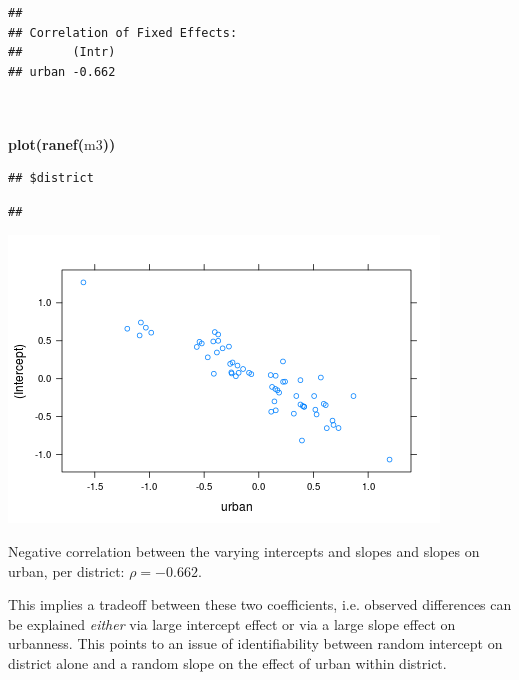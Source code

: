 \documentclass{article}
\makeatletter
\newcommand{\hlfunctioncall}[1]{\textcolor[rgb]{.5,0,.33}{\textbf{#1}}}%
\newcommand{\hlkeyword}[1]{\textbf{#1}}%
\newcommand{\hlsymbol}[1]{#1}%
\newcommand{\hlstd}[1]{\textcolor[rgb]{0,0,0}{#1}}%
\newenvironment{kframe}{%
 \def\FrameCommand##1{\hskip\@totalleftmargin \hskip-\fboxsep
 \colorbox{shadecolor}{##1}\hskip-\fboxsep
     \hskip-\linewidth \hskip-\@totalleftmargin \hskip\columnwidth}%
 \MakeFramed {\advance\hsize-\width
   \@totalleftmargin\z@ \linewidth\hsize
   \@setminipage}}%
 {\par\unskip\endMakeFramed}
\newenvironment{knitrout}{}{} %
\makeatother
\begin{document}
\begin{knitrout}
{\begin{kframe}
\begin{verbatim}
## 
## Correlation of Fixed Effects:
##       (Intr)
## urban -0.662
\end{verbatim}
\begin{flushleft}
\ttfamily\noindent
\hspace*{\fill}\\
\hlstd{}\hspace*{\fill}\\
\hlstd{}\hlfunctioncall{plot}\hlkeyword{(}\hlfunctioncall{ranef}\hlkeyword{(}\hlsymbol{m3}\hlkeyword{)}\hlkeyword{)}\mbox{}
\normalfont
\end{flushleft}
\begin{verbatim}
## $district
\end{verbatim}
\begin{verbatim}
## 
\end{verbatim}


\centering{}\includegraphics{urban-model} 

\end{kframe}}
\end{knitrout}


Negative correlation between the varying intercepts and slopes and slopes on urban, per district:  $\rho = - 0. 662$. 

This implies a tradeoff between these two coefficients, i.e. observed differences can be explained {\em either} via large intercept effect or via a large slope effect on urbanness. 
This points to an issue of identifiability between random intercept on district alone and a random slope on the effect of urban within district.
\end{document}
